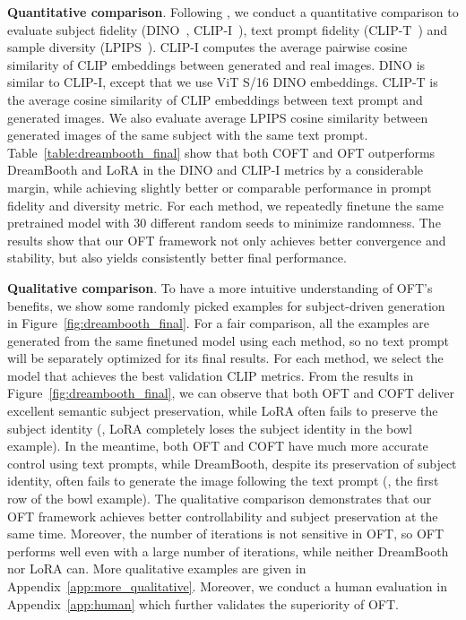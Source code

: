 \textbf{Quantitative comparison}. Following \cite{ruiz2023dreambooth}, we conduct a quantitative comparison to evaluate subject fidelity (DINO~\cite{caron2021emerging}, CLIP-I~\cite{radford2021learning}), text prompt fidelity (CLIP-T~\cite{radford2021learning}) and sample diversity (LPIPS~\cite{zhang2018unreasonable}). CLIP-I computes the average pairwise cosine similarity of CLIP embeddings between generated and real images. DINO is similar to CLIP-I, except that we use ViT S/16 DINO embeddings. CLIP-T is the average cosine similarity of CLIP embeddings between text prompt and generated images. We also evaluate average LPIPS cosine similarity between generated images of the same subject with the same text prompt. Table~\ref{table:dreambooth_final} show that both COFT and OFT outperforms DreamBooth and LoRA in the DINO and CLIP-I metrics by a considerable margin, while achieving slightly better or comparable performance in prompt fidelity and diversity metric. For each method, we repeatedly finetune the same pretrained model with 30 different random seeds to minimize randomness. The results show that our OFT framework not only achieves better convergence and stability, but also yields consistently better final performance.




\textbf{Qualitative comparison}. To have a more intuitive understanding of OFT's benefits, we show some randomly picked examples for subject-driven generation in Figure~\ref{fig:dreambooth_final}. For a fair comparison, all the examples are generated from the same finetuned model using each method, so no text prompt will be separately optimized for its final results. For each method, we select the model that achieves the best validation CLIP metrics. From the results in Figure~\ref{fig:dreambooth_final}, we can observe that both OFT and COFT deliver excellent semantic subject preservation, while LoRA often fails to preserve the subject identity (\eg, LoRA completely loses the subject identity in the bowl example). In the meantime, both OFT and COFT have much more accurate control using text prompts, while DreamBooth, despite its preservation of subject identity, often fails to generate the image following the text prompt (\eg, the first row of the bowl example). The qualitative comparison demonstrates that our OFT framework achieves better controllability and subject preservation at the same time. Moreover, the number of iterations is not sensitive in OFT, so OFT performs well even with a large number of iterations, while neither DreamBooth nor LoRA can. More qualitative examples are given in Appendix~\ref{app:more_qualitative}. Moreover, we conduct a human evaluation in Appendix~\ref{app:human} which further validates the superiority of OFT.


